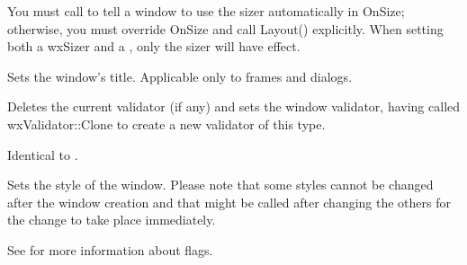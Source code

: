 


You must call  to tell a window to use
the sizer automatically in OnSize; otherwise, you must override OnSize and call Layout()
explicitly. When setting both a wxSizer and a ,
only the sizer will have effect.

\label{wxwindowsettitle}


Sets the window's title. Applicable only to frames and dialogs.





\label{wxwindowsetvalidator}


Deletes the current validator (if any) and sets the window validator, having called wxValidator::Clone to
create a new validator of this type.

\label{wxwindowsetwindowstyle}


Identical to .

\label{wxwindowsetwindowstyleflag}


Sets the style of the window. Please note that some styles cannot be changed
after the window creation and that  might
be called after changing the others for the change to take place immediately.

See  for more information about flags.


